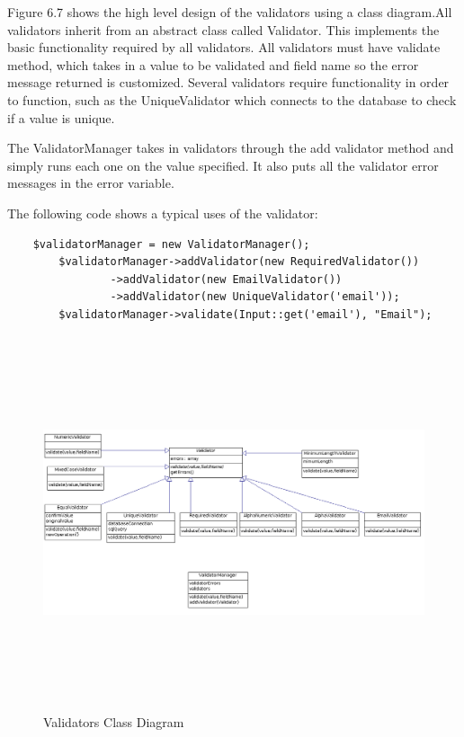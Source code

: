 \documentclass[a4paper,oneside,11pt]{report}
\begin{document}
Figure 6.7 shows the high level design of the validators using a class diagram.All validators inherit from an abstract class called Validator. This implements the basic functionality required by all validators. All validators must have validate method, which takes in a value to be validated and field name so the error message returned is customized. Several validators require functionality in order to function, such as the UniqueValidator which connects to the database to check if a value is unique.

The ValidatorManager takes in validators through the add validator method and simply runs each one on the value specified. It also puts all the validator error messages in the error variable.

The following code shows a typical uses of the validator:
\begin{lstlisting}
	$validatorManager = new ValidatorManager();	
        $validatorManager->addValidator(new RequiredValidator())
                ->addValidator(new EmailValidator())
                ->addValidator(new UniqueValidator('email'));
        $validatorManager->validate(Input::get('email'), "Email");
\end{lstlisting}

\begin{figure}
\centering
\includegraphics[width=\textwidth,height=11cm]{validator-class-diagram}
\caption{Validators Class Diagram}
\end{figure}

\pagebreak
\end{document}
